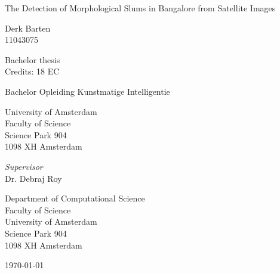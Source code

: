 \begin{center}

\vspace{1.7cm}

\begin{Huge}
The Detection of Morphological Slums in Bangalore from Satellite Images
\end{Huge}


\vspace{1.5cm}

Derk Barten\\
11043075

\vspace{1.5cm}

Bachelor thesis\\
Credits: 18 EC

\vspace{0.5cm}

Bachelor Opleiding Kunstmatige Intelligentie

\vspace{0.25cm}

University of Amsterdam\\
Faculty of Science\\
Science Park 904\\
1098 XH Amsterdam

\vspace{4cm}

\emph{Supervisor}\\
Dr. Debraj Roy

\vspace{0.25cm}

Department of Computational Science\\
Faculty of Science\\
University of Amsterdam\\
Science Park 904\\
1098 XH  Amsterdam

\vspace{1.5cm}

\today

\end{center}

